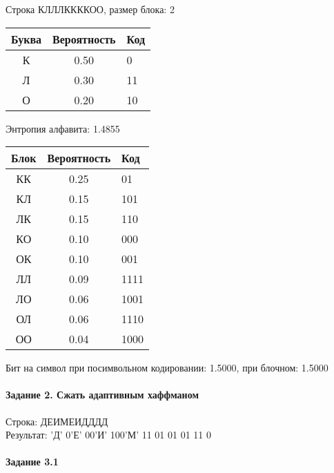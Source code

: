 \documentclass[a4paper, 12pt]{article}
\begin{document}
Строка КЛЛЛККККОО, размер блока: 2
\begin{center}
 \begin{tabular}{ |c|c|l| } 
  \hline
     Буква & Вероятность & Код\\ \hline
К & 0.50 & 0\\\hline
Л & 0.30 & 11\\\hline
О & 0.20 & 10
\\ \hline \end{tabular}
\end{center}
Энтропия алфавита: 1.4855
\begin{center}
 \begin{tabular}{ |c|c|l| } 
  \hline
     Блок & Вероятность & Код\\ \hline
КК & 0.25 & 01\\\hline
КЛ & 0.15 & 101\\\hline
ЛК & 0.15 & 110\\\hline
КО & 0.10 & 000\\\hline
ОК & 0.10 & 001\\\hline
ЛЛ & 0.09 & 1111\\\hline
ЛО & 0.06 & 1001\\\hline
ОЛ & 0.06 & 1110\\\hline
ОО & 0.04 & 1000
\\ \hline \end{tabular}
\end{center}
Бит на символ при посимвольном кодировании: 1.5000, при блочном: 1.5000


\pagebreak
\paragraph{Задание 2. Сжать адаптивным хаффманом\\}

Строка: 
ДЕИМЕИДДДД\\
Результат: 'Д' 0'Е' 00'И' 100'М' 11 01 01 01 11 0










\pagebreak
\paragraph{Задание 3.1}
\end{document}
